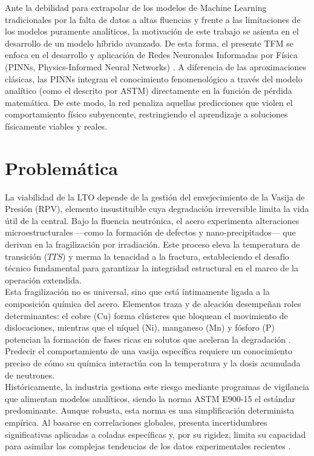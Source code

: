 \documentclass[a4paper, 12pt, twocolumn]{book}
\begin{document}
Ante la debilidad para extrapolar de los modelos de Machine Learning tradicionales por la falta de datos a altas fluencias y frente a las limitaciones de los modelos puramente analíticos, la motivación de este trabajo se asienta en el desarrollo de un modelo híbrido avanzado. De esta forma, el presente TFM se enfoca en el desarrollo y aplicación de Redes Neuronales Informadas por Física (PINNs, Physics-Informed Neural Networks) \parencite{karniadakis2021}. A diferencia de las aproximaciones clásicas, las PINNs integran el conocimiento fenomenológico a través del modelo analítico (como el descrito por ASTM) directamente en la función de pérdida matemática. De este modo, la red penaliza aquellas predicciones que violen el comportamiento físico subyencente, restringiendo el aprendizaje a soluciones físicamente viables y reales.

\section{Problemática}

La viabilidad de la LTO depende de la gestión del envejecimiento de la Vasija de Presión (RPV), elemento insustituible cuya degradación irreversible limita la vida útil de la central. Bajo la fluencia neutrónica, el acero experimenta alteraciones microestructurales —como la formación de defectos y nano-precipitados— que derivan en la fragilización por irradiación. Este proceso eleva la temperatura de transición ($TTS$) y merma la tenacidad a la fractura, estableciendo el desafío técnico fundamental para garantizar la integridad estructural en el marco de la operación extendida.\\

Esta fragilización no es universal, sino que está íntimamente ligada a la composición química del acero. Elementos traza y de aleación desempeñan roles determinantes: el cobre (Cu) forma clústeres que bloquean el movimiento de dislocaciones, mientras que el níquel (Ni), manganeso (Mn) y fósforo (P) potencian la formación de fases ricas en solutos que aceleran la degradación \parencite{dagata2025}. Predecir el comportamiento de una vasija específica requiere un conocimiento preciso de cómo su química interactúa con la temperatura y la dosis acumulada de neutrones.\\

Históricamente, la industria gestiona este riesgo mediante programas de vigilancia que alimentan modelos analíticos, siendo la norma ASTM E900-15 el estándar predominante. Aunque robusta, esta norma es una simplificación determinista empírica. Al basarse en correlaciones globales, presenta incertidumbres significativas aplicadas a coladas específicas y, por su rigidez, limita su capacidad para asimilar las complejas tendencias de los datos experimentales recientes \parencite{odette2019history}.\\
\end{document}
